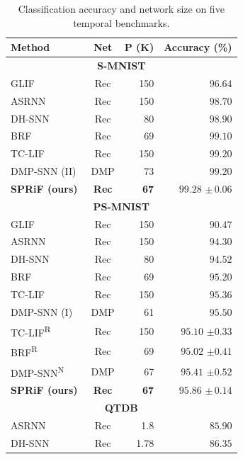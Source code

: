\documentclass[letterpaper,journal]{IEEEtran}
\begin{document}
\begin{table}[!t]
\caption{Classification accuracy and network size on five temporal benchmarks.}
\label{tab:main_results}
\centering
\begin{minipage}[t]{0.49\textwidth}
\vspace{0pt}
\centering\footnotesize
\setlength{\tabcolsep}{2pt}
\renewcommand{\arraystretch}{0.90}
\begin{tabular*}{\linewidth}{@{\extracolsep{\fill}}lcrr@{}}
\toprule
Method & Net & P (K) & Accuracy (\%)\\
\midrule
\multicolumn{4}{c}{\textbf{S-MNIST}}\\
\midrule
GLIF~\cite{glif} & Rec & 150 & $96.64$\\
ASRNN~\cite{asrnn} & Rec & 150 & $98.70$\\
DH-SNN~\cite{dhsnn} & Rec & 80 & $98.90$\\
BRF~\cite{brf} & Rec & 69 & $99.10$\\
TC-LIF~\cite{tclif} & Rec & 150 & $99.20$\\
DMP-SNN (II)~\cite{sun2026dmp} & DMP & 73 & $99.20$\\
\textbf{SPRiF (ours)} & \textbf{Rec} & \textbf{67} & $\mathbf{99.28}$ $\boldsymbol{\pm}\,\mathbf{0.06}$\\
\midrule
\multicolumn{4}{c}{\textbf{PS-MNIST}}\\
\midrule
GLIF~\cite{glif} & Rec & 150 & $90.47$\\
ASRNN~\cite{asrnn} & Rec & 150 & $94.30$\\
DH-SNN~\cite{dhsnn} & Rec & 80 & $94.52$\\
BRF~\cite{brf} & Rec & 69 & $95.20$\\
TC-LIF~\cite{tclif} & Rec & 150 & $95.36$\\
DMP-SNN (I)~\cite{sun2026dmp} & DMP & 61 & $95.50$\\
TC-LIF\textsuperscript{R}~\cite{tclif} & Rec & 150 & $95.10$ $\pm 0.33$\\
BRF\textsuperscript{R}~\cite{brf} & Rec & 69 & $95.02$ $\pm 0.41$\\
DMP-SNN\textsuperscript{N}~\cite{sun2026dmp} & DMP & 67 & $95.41$ $\pm 0.52$\\
\textbf{SPRiF (ours)} & \textbf{Rec} & \textbf{67} & $\mathbf{95.86}$ $\boldsymbol{\pm}\,\mathbf{0.14}$\\
\midrule
\multicolumn{4}{c}{\textbf{QTDB}}\\
\midrule
ASRNN~\cite{asrnn} & Rec & 1.8 & $85.90$\\
DH-SNN~\cite{dhsnn} & Rec & 1.78 & $86.35$\\

\end{tabular*}
\end{minipage}
\end{table}
\end{document}
